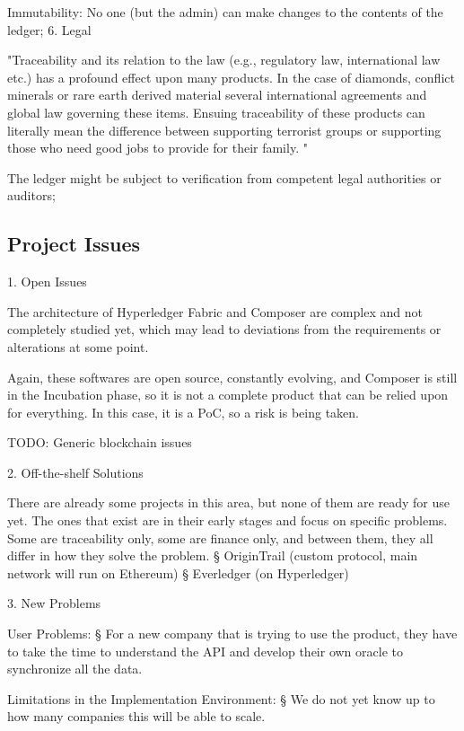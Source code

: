 {		\par Immutability: No one (but the admin) can make changes to the contents of the ledger;
	6. Legal
		\par "Traceability and its relation to the law (e.g., regulatory law, international law etc.) has a profound effect upon many products. In the case of diamonds, conflict minerals or rare earth derived material several international agreements and global law governing these items. Ensuing traceability of these products can literally mean the difference between supporting terrorist groups or supporting those who need good jobs to provide for their family. "
		\par The ledger might be subject to verification from competent legal authorities or auditors;

\subsection{Project Issues}
	1. Open Issues
		\par The architecture of Hyperledger Fabric and Composer are complex and not completely studied yet, which may lead to deviations from the requirements or alterations at some point.
		\par Again, these softwares are open source, constantly evolving, and Composer is still in the Incubation phase, so it is not a complete product that can be relied upon for everything. In this 
		case, it is a PoC, so a risk is being taken.
		\par TODO: Generic blockchain issues
	
	2. Off-the-shelf Solutions
		\par There are already some projects in this area, but none of them are ready for use yet. The ones that exist are in their early stages and focus on specific problems. Some are traceability only, some are finance only, and between them, they all differ in how they solve the problem.
			§ OriginTrail (custom protocol, main network will run on Ethereum)
			§ Everledger (on Hyperledger)
			
	3. New Problems
		\par User Problems: 
			§ For a new company that is trying to use the product, they have to take the time to understand the API and develop their own oracle to synchronize all the data. 
		\par Limitations in the Implementation Environment:
			§ We do not yet know up to how many companies this will be able to scale.
		
}
